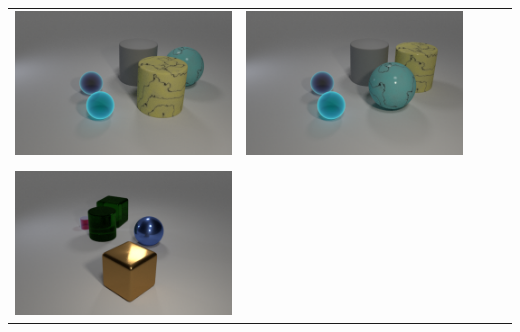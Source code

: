 \begin{table}
\begin{tabular}{@{}ccccc@{}}
\begin{minipage}{.2\textwidth}
      \includegraphics[width=\linewidth]{figures/clevr_datasets/CLEVRA_examples/test3.png}
    \end{minipage}
    &
        \begin{minipage}{.2\textwidth}
      \includegraphics[width=\linewidth]{figures/clevr_datasets/CLEVRA_examples/test_relation3.png}
    \end{minipage}
\\ \\
    \begin{minipage}{.2\textwidth}
      \includegraphics[width=\linewidth]{figures/clevr_datasets/CLEVRA_examples/train4.png}

\end{minipage}
\end{tabular}
\end{table}
